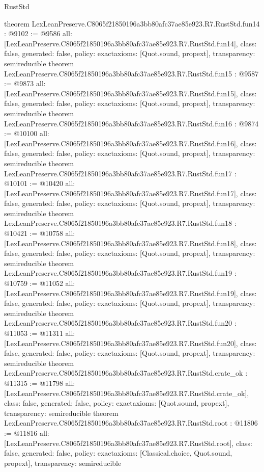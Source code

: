 \begin{lexlean}{RustStd}
\begin{coremodule}
{}
theorem LexLeanPreserve.C8065f21850196a3bb80afc37ae85e923.R7.RustStd.fun14 : @9102 := @9586 {
  all: [LexLeanPreserve.C8065f21850196a3bb80afc37ae85e923.R7.RustStd.fun14],
  class: false,
  generated: false,
  policy: exact{axioms: [Quot.sound, propext]},
  transparency: semireducible
}
theorem LexLeanPreserve.C8065f21850196a3bb80afc37ae85e923.R7.RustStd.fun15 : @9587 := @9873 {
  all: [LexLeanPreserve.C8065f21850196a3bb80afc37ae85e923.R7.RustStd.fun15],
  class: false,
  generated: false,
  policy: exact{axioms: [Quot.sound, propext]},
  transparency: semireducible
}
theorem LexLeanPreserve.C8065f21850196a3bb80afc37ae85e923.R7.RustStd.fun16 : @9874 := @10100 {
  all: [LexLeanPreserve.C8065f21850196a3bb80afc37ae85e923.R7.RustStd.fun16],
  class: false,
  generated: false,
  policy: exact{axioms: [Quot.sound, propext]},
  transparency: semireducible
}
theorem LexLeanPreserve.C8065f21850196a3bb80afc37ae85e923.R7.RustStd.fun17 : @10101 := @10420 {
  all: [LexLeanPreserve.C8065f21850196a3bb80afc37ae85e923.R7.RustStd.fun17],
  class: false,
  generated: false,
  policy: exact{axioms: [Quot.sound, propext]},
  transparency: semireducible
}
theorem LexLeanPreserve.C8065f21850196a3bb80afc37ae85e923.R7.RustStd.fun18 : @10421 := @10758 {
  all: [LexLeanPreserve.C8065f21850196a3bb80afc37ae85e923.R7.RustStd.fun18],
  class: false,
  generated: false,
  policy: exact{axioms: [Quot.sound, propext]},
  transparency: semireducible
}
theorem LexLeanPreserve.C8065f21850196a3bb80afc37ae85e923.R7.RustStd.fun19 : @10759 := @11052 {
  all: [LexLeanPreserve.C8065f21850196a3bb80afc37ae85e923.R7.RustStd.fun19],
  class: false,
  generated: false,
  policy: exact{axioms: [Quot.sound, propext]},
  transparency: semireducible
}
theorem LexLeanPreserve.C8065f21850196a3bb80afc37ae85e923.R7.RustStd.fun20 : @11053 := @11311 {
  all: [LexLeanPreserve.C8065f21850196a3bb80afc37ae85e923.R7.RustStd.fun20],
  class: false,
  generated: false,
  policy: exact{axioms: [Quot.sound, propext]},
  transparency: semireducible
}
theorem LexLeanPreserve.C8065f21850196a3bb80afc37ae85e923.R7.RustStd.crate_ok : @11315 := @11798 {
  all: [LexLeanPreserve.C8065f21850196a3bb80afc37ae85e923.R7.RustStd.crate_ok],
  class: false,
  generated: false,
  policy: exact{axioms: [Quot.sound, propext]},
  transparency: semireducible
}
theorem LexLeanPreserve.C8065f21850196a3bb80afc37ae85e923.R7.RustStd.root : @11806 := @11816 {
  all: [LexLeanPreserve.C8065f21850196a3bb80afc37ae85e923.R7.RustStd.root],
  class: false,
  generated: false,
  policy: exact{axioms: [Classical.choice, Quot.sound, propext]},
  transparency: semireducible
}


\end{coremodule}
\end{lexlean}
